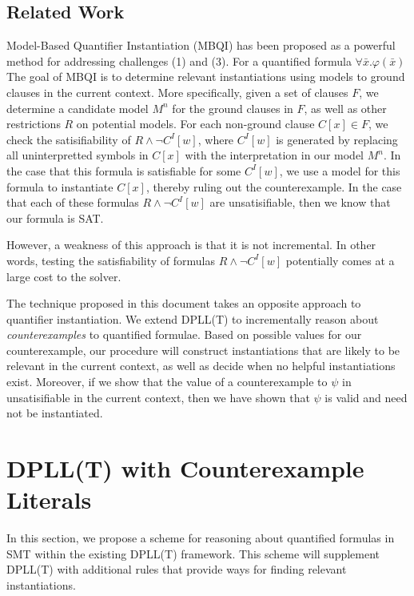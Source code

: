 \documentclass{llncs}
\begin{document}
\subsection{Related Work}

Model-Based Quantifier Instantiation (MBQI) has been proposed as a powerful method for addressing challenges (1) and (3).
For a quantified formula $\forall \bar{x}. \varphi(\bar{x})$
The goal of MBQI is to determine relevant instantiations using models to ground clauses in the current context.
More specifically, given a set of clauses $F$, we determine a candidate model $M^n$ for the ground clauses in $F$, as well as other restrictions $R$ on potential models.
For each non-ground clause $C[x] \in F$, we check the satisifiability of $R \wedge \neg C^I[w]$, where $C^I[w]$ is generated by replacing all uninterpretted symbols in $C[x]$ with the interpretation in our model $M^n$.
In the case that this formula is satisfiable for some $C^I[w]$, we use a model for this formula to instantiate $C[x]$, thereby ruling out the counterexample.
In the case that each of these formulas $R \wedge \neg C^I[w]$ are unsatisifiable, then we know that our formula is SAT.

However, a weakness of this approach is that it is not incremental.
In other words, testing the satisfiability of formulas $R \wedge \neg C^I[w]$ potentially comes at a large cost to the solver.

The technique proposed in this document takes an opposite approach to quantifier instantiation.
We extend DPLL(T) to incrementally reason about \emph{counterexamples} to quantified formulae.
Based on possible values for our counterexample, our procedure will construct instantiations that are likely to be relevant in the current context, as well as decide when no helpful instantiations exist.
Moreover, if we show that the value of a counterexample to $\psi$ in unsatisifiable in the current context, then we have shown that $\psi$ is valid and need not be instantiated.

\section{DPLL(T) with Counterexample Literals}
\label{dpll-ce-lit}

In this section, we propose a scheme for reasoning about quantified formulas in SMT within the existing DPLL(T) framework.
This scheme will supplement DPLL(T) with additional rules that provide ways for finding relevant instantiations.
\end{document}
